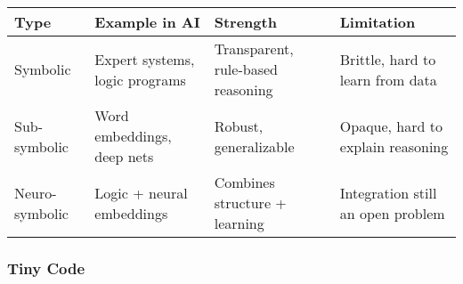 \documentclass[
  letterpaper,
  DIV=11,
  numbers=noendperiod]{scrreprt}
\begin{document}
\begin{longtable}[]{@{}
  >{\raggedright\arraybackslash}p{}
  >{\raggedright\arraybackslash}p{}
  >{\raggedright\arraybackslash}p{}
  >{\raggedright\arraybackslash}p{}@{}}
\toprule\noalign{}
\begin{minipage}[b]{\linewidth}\raggedright
Type
\end{minipage} & \begin{minipage}[b]{\linewidth}\raggedright
Example in AI
\end{minipage} & \begin{minipage}[b]{\linewidth}\raggedright
Strength
\end{minipage} & \begin{minipage}[b]{\linewidth}\raggedright
Limitation
\end{minipage} \\
\midrule\noalign{}
\endhead
\bottomrule\noalign{}
\endlastfoot
Symbolic & Expert systems, logic programs & Transparent, rule-based
reasoning & Brittle, hard to learn from data \\
Sub-symbolic & Word embeddings, deep nets & Robust, generalizable &
Opaque, hard to explain reasoning \\
Neuro-symbolic & Logic + neural embeddings & Combines structure +
learning & Integration still an open problem \\
\end{longtable}

\subsubsection{Tiny Code}\label{tiny-code-41}
\end{document}
